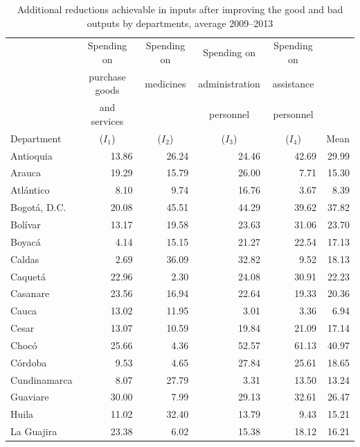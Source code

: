 \documentclass[11pt,a4paper,oneside]{article}
\begin{document}
\begin{table}[htbp]
  \centering
  \caption{Additional reductions achievable in inputs after improving the good and bad outputs by departments, average 2009--2013}
    \begin{tabular}{lrrrrr}
    \toprule
          & \multicolumn{1}{c}{Spending on } & \multicolumn{1}{c}{Spending on } & \multicolumn{1}{c}{Spending on } & \multicolumn{1}{c}{Spending on } &  \\
          & \multicolumn{1}{c}{purchase goods } & \multicolumn{1}{c}{medicines} & \multicolumn{1}{c}{administration} & \multicolumn{1}{c}{assistance} &  \\
          & \multicolumn{1}{c}{and services} &       & \multicolumn{1}{c}{personnel} & \multicolumn{1}{c}{personnel} &  \\
    Department & \multicolumn{1}{c}{($I_1$)} & \multicolumn{1}{c}{($I_2$)} & \multicolumn{1}{c}{($I_3$)} & \multicolumn{1}{c}{($I_4$)} & \multicolumn{1}{c}{Mean} \\
    \midrule
    Antioquia & 13.86 & 26.24 & 24.46 & 42.69 & 29.99 \\
    Arauca & 19.29 & 15.79 & 26.00 & 7.71 & 15.30 \\
    Atl\'antico & 8.10 & 9.74 & 16.76 & 3.67 & 8.39 \\
    Bogot\'a, D.C. & 20.08 & 45.51 & 44.29 & 39.62 & 37.82 \\
    Bol\'ivar & 13.17 & 19.58 & 23.63 & 31.06 & 23.70 \\
    Boyac\'a & 4.14 & 15.15 & 21.27 & 22.54 & 17.13 \\
    Caldas & 2.69 & 36.09 & 32.82 & 9.52 & 18.13 \\
    Caquet\'a & 22.96 & 2.30 & 24.08 & 30.91 & 22.23 \\
    Casanare & 23.56 & 16.94 & 22.64 & 19.33 & 20.36 \\
    Cauca & 13.02 & 11.95 & 3.01 & 3.36 & 6.94 \\
    Cesar & 13.07 & 10.59 & 19.84 & 21.09 & 17.14 \\
    Choc\'o & 25.66 & 4.36 & 52.57 & 61.13 & 40.97 \\
    C\'ordoba & 9.53 & 4.65 & 27.84 & 25.61 & 18.65 \\
    Cundinamarca & 8.07 & 27.79 & 3.31 & 13.50 & 13.24 \\
    Guaviare & 30.00 & 7.99 & 29.13 & 32.61 & 26.47 \\
    Huila & 11.02 & 32.40 & 13.79 & 9.43 & 15.21 \\
    La Guajira & 23.38 & 6.02 & 15.38 & 18.12 & 16.21 \\

\end{tabular}
\end{table}
\end{document}
